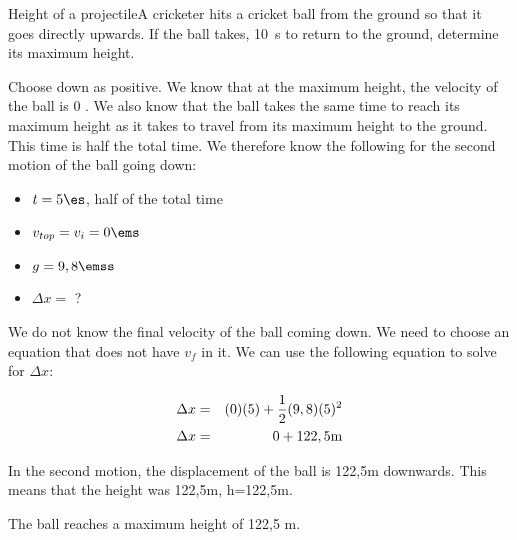 \begin{wex}{Height of a projectile}{A cricketer hits a cricket ball from the ground so that it goes directly upwards. If the ball takes, 10~s to return to the ground, determine its maximum height.}
{Choose down as positive. We know that at the maximum height, the velocity of the ball is 0 \ms. We also know that the ball takes the same time to reach its maximum height as it takes to travel from its maximum height to the ground. This time is half the total time. We therefore know the following for the second motion of the ball going down:
\begin{itemize}
\item{$t=5\es$, half of the total time}
\item{$v_{top}=v_i=0\ems$}
\item{$g=9,8\emss$}
\item{$\Delta x=$ ?}
\end{itemize}

We do not know the final velocity of the ball coming down. We need to choose an equation that does not have $v_f$ in it. We can use the following equation to solve for $\Delta x$:

\begin{eqnarray*}
\Delta x &=& (0)(5) + \frac{1}{2}(9,8)(5)^2\\
\Delta x &=& 0 + 122,5 \rm{m}\\
\end{eqnarray*}

In the second motion, the displacement of the ball is 122,5m downwards. This means that the height was 122,5m, h=122,5m.

The ball reaches a maximum height of 122,5 m.}
\end{wex}

